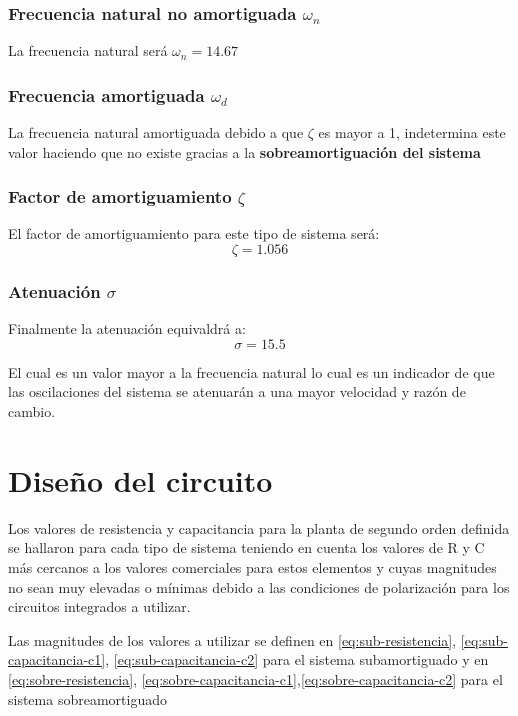 \documentclass[conference]{IEEEtran}
\begin{document}
	\subsubsection{Frecuencia natural no amortiguada $\omega_n$}
	
	La frecuencia natural será $ \omega_n = 14.67$
	
	\subsubsection{Frecuencia amortiguada $\omega_d$}
	La frecuencia natural amortiguada debido a que $\zeta$ es mayor a 1, indetermina este valor haciendo que no existe gracias a la \textbf{sobreamortiguación del sistema}
	
	\subsubsection{Factor de amortiguamiento $\zeta$}
	El factor de amortiguamiento para este tipo de sistema será:
	\begin{equation}
		\zeta = 1.056
		\label{eq:sobre-factor-amortiguamiento}
	\end{equation}
	
	\subsubsection{Atenuación $\sigma$}
	Finalmente la atenuación equivaldrá a:
	\begin{equation}
		\sigma = 15.5
	\end{equation}
	
	El cual es un valor mayor a la frecuencia natural lo cual es un indicador de que las oscilaciones del sistema se atenuarán a una mayor velocidad y razón de cambio.
	
	\section{Diseño del circuito}
	Los valores de resistencia y capacitancia para la planta de segundo orden definida se hallaron para cada tipo de sistema teniendo en cuenta los valores de R y C más cercanos a los valores comerciales para estos elementos y cuyas magnitudes no sean muy elevadas o mínimas debido a las condiciones de polarización para los circuitos integrados a utilizar.
	
	Las magnitudes de los valores a utilizar se definen en \ref{eq:sub-resistencia}, \ref{eq:sub-capacitancia-c1}, \ref{eq:sub-capacitancia-c2} para el sistema subamortiguado y en \ref{eq:sobre-resistencia}, \ref{eq:sobre-capacitancia-c1},\ref{eq:sobre-capacitancia-c2} para el sistema sobreamortiguado
	
\end{document}

